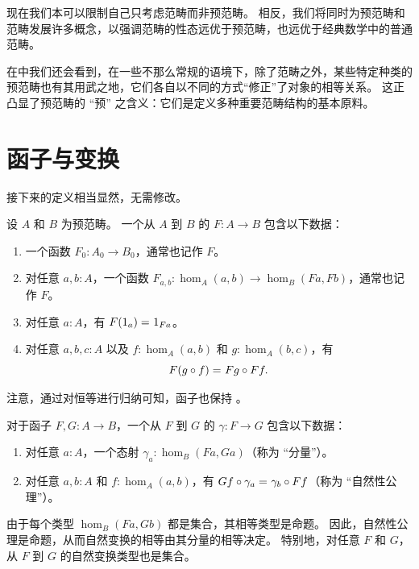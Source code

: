 现在我们本可以限制自己只考虑范畴而非预范畴。
相反，我们将同时为预范畴和范畴发展许多概念，以强调范畴的性态远优于预范畴，也远优于经典数学中的普通范畴。

在中我们还会看到，在一些不那么常规的语境下，除了范畴之外，某些特定种类的预范畴也有其用武之地，它们各自以不同的方式``修正''了对象的相等关系。
这正凸显了预范畴的 ``预'' 之含义：它们是定义多种重要范畴结构的基本原料。

\section{函子与变换}
\label{sec:transfors}

接下来的定义相当显然，无需修改。

\begin{defn}\label{ct:functor}
  设 $A$ 和 $B$ 为预范畴。
  一个从 $A$ 到 $B$ 的
  $F:A\to B$ 包含以下数据：
  \begin{enumerate}
  \item 一个函数 $F_0:A_0\to B_0$，通常也记作 $F$。
  \item 对任意 $a,b:A$，一个函数 $F_{a,b}:\hom_A(a,b) \to \hom_B(Fa,Fb)$，通常也记作 $F$。
  \item 对任意 $a:A$，有 $F(1_a) =_{} 1_{Fa}$。
  \item 对任意 $a,b,c:A$ 以及 $f:\hom_A(a,b)$ 和 $g:\hom_A(b,c)$，有
    \[F(g\circ f) =_{} Fg\circ Ff.\]\label{ct:functor:comp}
  \end{enumerate}
\end{defn}

注意，通过对恒等进行归纳可知，函子也保持 \idtoiso。

\begin{defn}\label{ct:nattrans}
  对于函子 $F,G:A\to B$，一个从 $F$ 到 $G$ 的
  $\gamma:F\to G$ 包含以下数据：
  \begin{enumerate}
  \item 对任意 $a:A$，一个态射 $\gamma_a:\hom_B(Fa,Ga)$（称为 ``分量''）。
  \item 对任意 $a,b:A$ 和 $f:\hom_A(a,b)$，有 $Gf\circ \gamma_a =_{} \gamma_b\circ Ff$（称为 ``自然性公理''）。
  \end{enumerate}
\end{defn}

由于每个类型 $\hom_B(Fa,Gb)$ 都是集合，其相等类型是命题。
因此，自然性公理是命题，从而自然变换的相等由其分量的相等决定。
特别地，对任意 $F$ 和 $G$，从 $F$ 到 $G$ 的自然变换类型也是集合。

